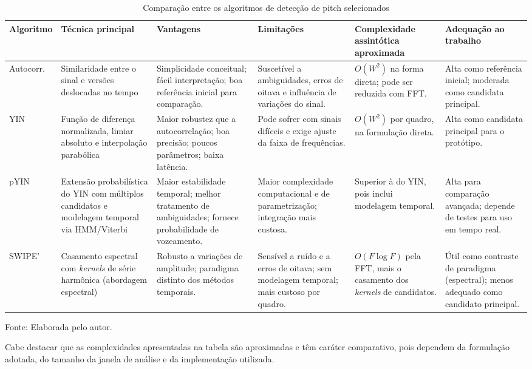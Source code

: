 \begin{table}[h]
\centering
\small
\caption{Comparação entre os algoritmos de detecção de pitch selecionados}
\begin{tabularx}{\textwidth}{|p{2.1cm}|p{2.2cm}|X|X|p{2.1cm}|p{2.4cm}|}
\hline
\textbf{Algoritmo} & \textbf{Técnica principal} & \textbf{Vantagens} & \textbf{Limitações} & \textbf{Complexidade assintótica aproximada} & \textbf{Adequação ao trabalho} \\
\hline
Autocorr. & Similaridade entre o sinal e versões deslocadas no tempo &
Simplicidade conceitual; fácil interpretação; boa referência inicial para comparação. &
Suscetível a ambiguidades, erros de oitava e influência de variações do sinal. &
\(O(W^2)\) na forma direta; pode ser reduzida com FFT. &
Alta como referência inicial; moderada como candidata principal. \\
\hline
YIN & Função de diferença normalizada, limiar absoluto e interpolação parabólica &
Maior robustez que a autocorrelação; boa precisão; poucos parâmetros; baixa latência. &
Pode sofrer com sinais difíceis e exige ajuste da faixa de frequências. &
\(O(W^2)\) por quadro, na formulação direta. &
Alta como candidata principal para o protótipo. \\
\hline
pYIN & Extensão probabilística do YIN com múltiplos candidatos e modelagem temporal via HMM/Viterbi &
Maior estabilidade temporal; melhor tratamento de ambiguidades; fornece probabilidade de vozeamento. &
Maior complexidade computacional e de parametrização; integração mais custosa. &
Superior à do YIN, pois inclui modelagem temporal. &
Alta para comparação avançada; depende de testes para uso em tempo real. \\
\hline
SWIPE' & Casamento espectral com \textit{kernels} de série harmônica (abordagem espectral) &
Robusto a variações de amplitude; paradigma distinto dos métodos temporais. &
Sensível a ruído e a erros de oitava; sem modelagem temporal; mais custoso por quadro. &
\(O(F \log F)\) pela FFT, mais o casamento dos \textit{kernels} de candidatos. &
Útil como contraste de paradigma (espectral); menos adequado como candidato principal. \\
\hline
\end{tabularx}
\small Fonte: Elaborada pelo autor.
\end{table}

Cabe destacar que as complexidades apresentadas na tabela são aproximadas e têm caráter comparativo, pois dependem da formulação adotada, do tamanho da janela de análise e da implementação utilizada.


